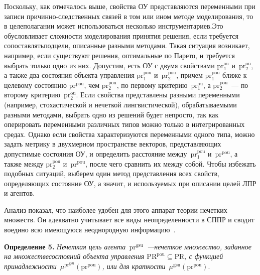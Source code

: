 \begin{multicols}{2}
  Поскольку, как отмечалось выше, свойства ОУ представляются переменными 
при записи причинно-следственных связей в том или ином методе 
моделирования, то в целеполагании мо\-жет использоваться несколько 
инструментариев.\linebreak Это обусловливает сложности моделирования принятия 
решения, если требуется сопоставлять\linebreak подцели, описанные разными методами. 
Такая ситуация возникает, например, если существуют решения, оптимальные 
по Парето, и требуется выбрать только одно из них. Допустим, есть ОУ с двумя 
свойствами pr$_1^{\mathrm{ou}}$ и~pr$_2^{\mathrm{ou}}$, а также два состояния объекта 
управления pr$_1^{\mathrm{pou}}$ и~pr$_2^{\mathrm{pou}}$, причем pr$_1^{\mathrm{pou}}$ ближе к 
целевому состоянию pr$^{\mathrm{pou}}$, чем pr$_2^{\mathrm{pou}}$, по первому 
критерию~pr$_1^{\mathrm{ou}}$, а pr$_2^{\mathrm{pou}}$~--- по второму критерию~pr$_2^{\mathrm{ou}}$. Если 
свойства представлены разными переменными (например, стохастической и 
нечеткой лингвистической), обрабатываемыми разными методами, выбрать 
одно из решений будет не\-прос\-то, так как оперировать переменными различных 
типов можно только в интегрированных средах. Однако если свойства 
характеризуются переменными одного типа, можно задать метрику в двухмерном 
пространстве векторов, представляющих допустимые состояния ОУ, и 
определить расстояние между~pr$_1^{\mathrm{pou}}$ и~pr$^{\mathrm{pou}}$, а также между 
pr$_2^{\mathrm{pou}}$ и~pr$^{\mathrm{pou}}$, после чего сравнить их между собой. Чтобы 
избежать подобных ситуаций, выберем один метод пред\-став\-ле\-ния всех свойств, 
определяющих состояние ОУ, а значит, и используемых при описании целей 
ЛПР и агентов.
  
  Анализ показал, что наиболее удобен для этого аппарат теории нечетких 
множеств. Он адекватно учитывает все виды неопределенности в СППР и 
сводит воедино всю имеющуюся неоднородную информацию~\cite{13kir}.
  
  \smallskip
  
  \noindent
  \textbf{Определение 5.} \textit{Нечеткая цель агента~$\mathrm{pr}^{\mathrm{gsu}}$~---\linebreak нечеткое 
множество, заданное на множестве\linebreak со\-сто\-яний объекта управления 
$\mathrm{PR}^{\mathrm{pou}}\subseteq \mathrm{PR}$, с функцией принадлежности~$\mu^{\mathrm{pr}^{\mathrm{gsu}}} 
(\mathrm{pr}^{\mathrm{pou}})$, или для крат\-кости}~$\mu^{\mathrm{gsu}}(\mathrm{pr}^{\mathrm{pou}})$.


\end{multicols}
